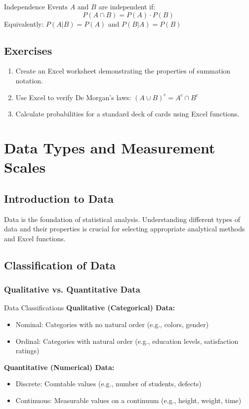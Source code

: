 \documentclass[12pt,a4paper]{book}
\begin{document}
\begin{definition}{Independence}
Events $A$ and $B$ are independent if:
\[
P(A \cap B) = P(A) \cdot P(B)
\]
Equivalently: $P(A|B) = P(A)$ and $P(B|A) = P(B)$
\end{definition}

\section{Exercises}

\begin{enumerate}
    \item Create an Excel worksheet demonstrating the properties of summation notation.
    \item Use Excel to verify De Morgan's laws: $(A \cup B)^c = A^c \cap B^c$
    \item Calculate probabilities for a standard deck of cards using Excel functions.
\end{enumerate}

\chapter{Data Types and Measurement Scales}

\section{Introduction to Data}

Data is the foundation of statistical analysis. Understanding different types of data and their properties is crucial for selecting appropriate analytical methods and Excel functions.

\section{Classification of Data}

\subsection{Qualitative vs. Quantitative Data}

\begin{definition}{Data Classifications}
\textbf{Qualitative (Categorical) Data:}
\begin{itemize}
    \item Nominal: Categories with no natural order (e.g., colors, gender)
    \item Ordinal: Categories with natural order (e.g., education levels, satisfaction ratings)
\end{itemize}

\textbf{Quantitative (Numerical) Data:}
\begin{itemize}
    \item Discrete: Countable values (e.g., number of students, defects)
    \item Continuous: Measurable values on a continuum (e.g., height, weight, time)
\end{itemize}
\end{definition}
\end{document}
